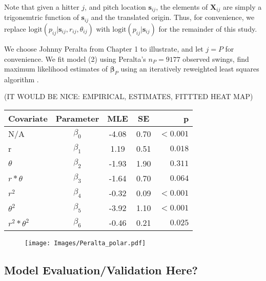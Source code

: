 \documentclass{article}
\begin{document}
Note that given a hitter $j$, and pitch location $\pmb{s}_{ij}$, the elements of $\pmb{X}_{ij}$ are simply a trigonemtric function of $\pmb{s}_{ij}$ and the translated origin. Thus, for convenience, we replace $\text{logit}(p_{ij}|\pmb{s}_{ij}, r_{ij}, \theta_{ij})$ with $\text{logit}(p_{ij}|\pmb{s}_{ij})$ for the remainder of this study.

We choose Johnny Peralta from Chapter 1 to illustrate, and let $j = P$ for convenience. We fit model (2) using Peralta's $n_{P} = 9177$ observed swings, find maximum likelihood estimates of $\pmb{\beta}_{P}$ using an iteratively reweighted least squares algorithm \citep{Myers2012}. 

(IT WOULD BE NICE: EMPIRICAL, ESTIMATES, FITTTED HEAT MAP) \\
\begin{tabular}{ l | c | c | c | r }

    \hline
    Covariate         & Parameter   & MLE   & SE     &      p    \\ \hline \hline
    N/A               & $\beta_{0}$ & -4.08 & 0.70 & $ <0.001$ \\ \hline
    r                 & $\beta_{1}$ &  1.19 & 0.51 & $  0.018$ \\ \hline
    $\theta$          & $\beta_{2}$ & -1.93 & 1.90 & $  0.311$ \\ \hline
    $r*\theta$        & $\beta_{3}$ & -1.64 & 0.70 & $  0.064$ \\ \hline
    $r^{2}$           & $\beta_{4}$ & -0.32 & 0.09 & $ <0.001$ \\ \hline
    $\theta^{2}$      & $\beta_{5}$ & -3.92 & 1.10 & $ <0.001$ \\ \hline
    $r^{2}*\theta^{2}$& $\beta_{6}$ & -0.46 & 0.21 & $  0.025$ \\ \hline
    \hline  

  \end{tabular}

  \begin{figure}[H]
	\texttt{[image: Images/Peralta\_polar.pdf]} 
  \caption{}
  
	\end{figure} 
\subsection{Model Evaluation/Validation Here?}

\end{document}

